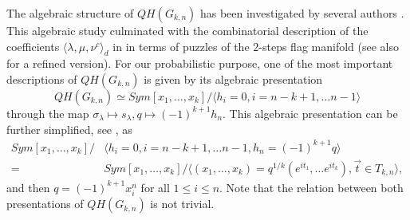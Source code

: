 \documentclass[10pt,11pt]{amsart}%
\begin{document}
The algebraic structure of $QH(G_{k,n})$ has been investigated by several authors \cite{B,BCF,BKPT}. This algebraic study culminated with the combinatorial description of the coefficients $\langle\lambda,\mu,\nu^c\rangle_d$ in \cite{BKPT} in terms of puzzles of the $2$-steps flag manifold (see also \cite{Bu} for a refined version). For our probabilistic purpose, one of the most important descriptions of $QH(G_{k,n})$ is given by its algebraic presentation
$$QH(G_{k,n})\simeq Sym[x_1,\ldots,x_k]/\langle h_i=0,i=n-k+1,\ldots n-1\rangle$$
through the map $\sigma_\lambda\mapsto s_{\lambda}, q\mapsto (-1)^{k+1}h_{n}$. This algebraic presentation can be further simplified, see \cite{Ri}, as
\begin{align*}
Sym[x_1,\ldots,x_k]/&\langle h_i=0,i=n-k+1,\ldots n-1, h_{n}=(-1)^{k+1}q\rangle\\
=&Sym[x_1,\ldots,x_k]/\langle (x_1,\ldots,x_k)=q^{1/k}\left(e^{it_1},\ldots e^{it_k}\right), \vec{t}\in T_{k,n}\rangle,
\end{align*}
and then $q=(-1)^{k+1}x_i^n$ for all $1\leq i\leq n$. Note that the relation between both presentations of $QH(G_{k,n})$ is not trivial.
\end{document}
